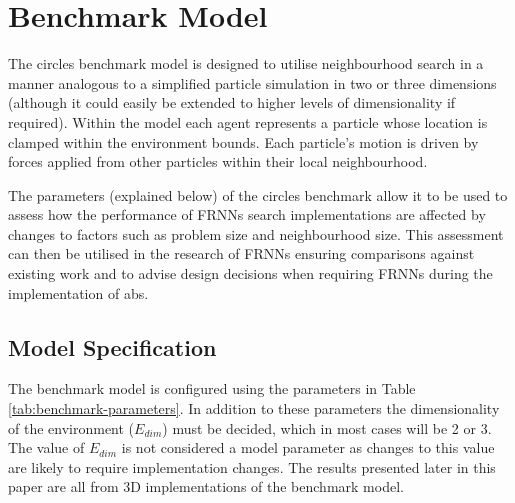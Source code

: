 \vspace{-0.3cm}
\section{Benchmark Model\label{sec:benchmark-model}}
\vspace{-0.4cm}
  The circles benchmark model is designed to utilise neighbourhood search in a manner analogous to a simplified particle simulation in two or three dimensions (although it could easily be extended to higher levels of dimensionality if required). Within the model each agent represents a particle whose location is clamped within the environment bounds. Each particle's motion is driven by forces applied from other particles within their local neighbourhood.
   
  The parameters (explained below) of the circles benchmark allow it to be used to assess how the performance of FRNNs search implementations are affected by changes to factors such as problem size and neighbourhood size. This assessment can then be utilised in the research of FRNNs ensuring comparisons against existing work and to advise design decisions when requiring FRNNs during the implementation of \gls{abs}.
  
  \subsection{Model Specification}  
\vspace{-0.3cm}
    The benchmark model is configured using the parameters in Table \ref{tab:benchmark-parameters}. In addition to these parameters the dimensionality of the environment ($E_{dim}$) must be decided, which in most cases will be 2 or 3. The value of $E_{dim}$ is not considered a model parameter as changes to this value are likely to require implementation changes. The results presented later in this paper are all from 3D implementations of the benchmark model. 

